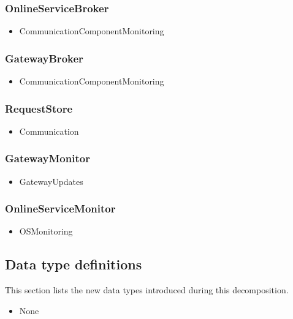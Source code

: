     \subsubsection{OnlineServiceBroker}
        \begin{itemize}
            \item CommunicationComponentMonitoring
        \end{itemize}

    \subsubsection{GatewayBroker}
        \begin{itemize}
            \item CommunicationComponentMonitoring
        \end{itemize}

    \subsubsection{RequestStore}
        \begin{itemize}
            \item Communication
        \end{itemize}

    \subsubsection{GatewayMonitor}
        \begin{itemize}
            \item GatewayUpdates
        \end{itemize}

    \subsubsection{OnlineServiceMonitor}
        \begin{itemize}
            \item OSMonitoring
        \end{itemize}

\subsection{Data type definitions}
    This section lists the new data types introduced during this decomposition.

    \begin{itemize}
        \item None
    \end{itemize}
